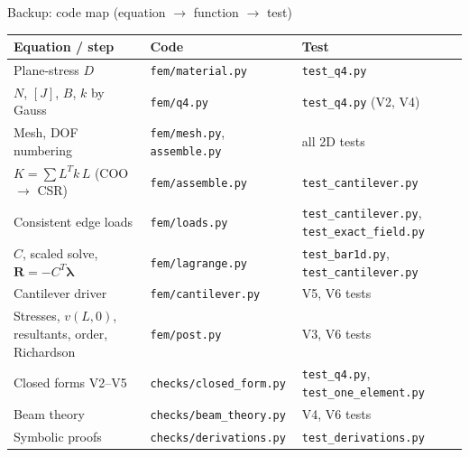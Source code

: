 \documentclass[aspectratio=169,10pt]{beamer}
\newcommand{\vR}{\mathbf R}
\newcommand{\vlam}{\bm{\lambda}}
\begin{document}
\appendix

\begin{frame}{Backup: code map (equation $\to$ function $\to$ test)}
  \footnotesize
  \begin{tabular}{@{}L{0.34\textwidth}L{0.31\textwidth}L{0.29\textwidth}@{}}
    \toprule
    Equation / step & Code & Test \\
    \midrule
    Plane-stress $D$ & \texttt{fem/material.py} & \texttt{test\_q4.py} \\
    $N$, $[J]$, $B$, $k$ by Gauss & \texttt{fem/q4.py} & \texttt{test\_q4.py} (V2, V4) \\
    Mesh, DOF numbering & \texttt{fem/mesh.py}, \texttt{assemble.py} & all 2D tests \\
    $K=\sum L^Tk\,L$ (COO $\to$ CSR) & \texttt{fem/assemble.py} & \texttt{test\_cantilever.py} \\
    Consistent edge loads & \texttt{fem/loads.py} & \texttt{test\_cantilever.py}, \texttt{test\_exact\_field.py} \\
    $C$, scaled solve, $\vR=-C^T\vlam$ & \texttt{fem/lagrange.py} & \texttt{test\_bar1d.py}, \texttt{test\_cantilever.py} \\
    Cantilever driver & \texttt{fem/cantilever.py} & V5, V6 tests \\
    Stresses, $v(L,0)$, resultants, order, Richardson & \texttt{fem/post.py} & V3, V6 tests \\
    Closed forms V2--V5 & \texttt{checks/closed\_form.py} & \texttt{test\_q4.py}, \texttt{test\_one\_element.py} \\
    Beam theory & \texttt{checks/beam\_theory.py} & V4, V6 tests \\
    Symbolic proofs & \texttt{checks/derivations.py} & \texttt{test\_derivations.py} \\
    \bottomrule
  \end{tabular}
\end{frame}
\end{document}
